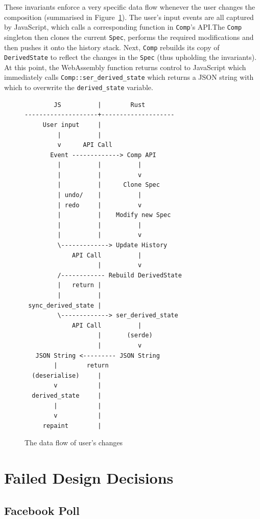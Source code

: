 \documentclass[12pt]{article}
\begin{document}
These invariants enforce a very specific data flow whenever the user changes the composition
(summarised in Figure~\ref{fig:app_data_flow}).  The user's input events are all captured by
JavaScript, which calls a corresponding function in \verb|Comp|'s API.\@ The \verb|Comp| singleton
then clones the current \verb|Spec|, performs the required modifications and then pushes it onto the
history stack.  Next, \verb|Comp| rebuilds its copy of \verb|DerivedState| to reflect the changes in
the \verb|Spec| (thus upholding the invariants).  At this point, the WebAssembly function returns
control to JavaScript which immediately calls \verb|Comp::ser_derived_state| which returns a JSON
string with which to overwrite the \verb|derived_state| variable.

\begin{figure}
    \centering
    \begin{BVerbatim}
        JS          |        Rust
--------------------+--------------------
     User input     |
         |          |
         v      API Call
       Event -------------> Comp API
         |          |          |
         |          |          v
         |          |      Clone Spec
         | undo/    |          |
         | redo     |          v
         |          |    Modify new Spec
         |          |          |
         |          |          v
         \-------------> Update History
             API Call          |
                    |          v
         /------------ Rebuild DerivedState
         |   return |
         |          |
 sync_derived_state |
         \-------------> ser_derived_state
             API Call          |
                    |       (serde)
                    |          v
   JSON String <--------- JSON String
        |        return
  (deserialise)     |
        v           |
  derived_state     |
        |           |
        v           |
     repaint        |
    \end{BVerbatim}
    \caption{The data flow of user's changes}\label{fig:app_data_flow}
\end{figure}



\pagebreak

\section{Failed Design Decisions}

\subsection{Facebook Poll}
\end{document}
